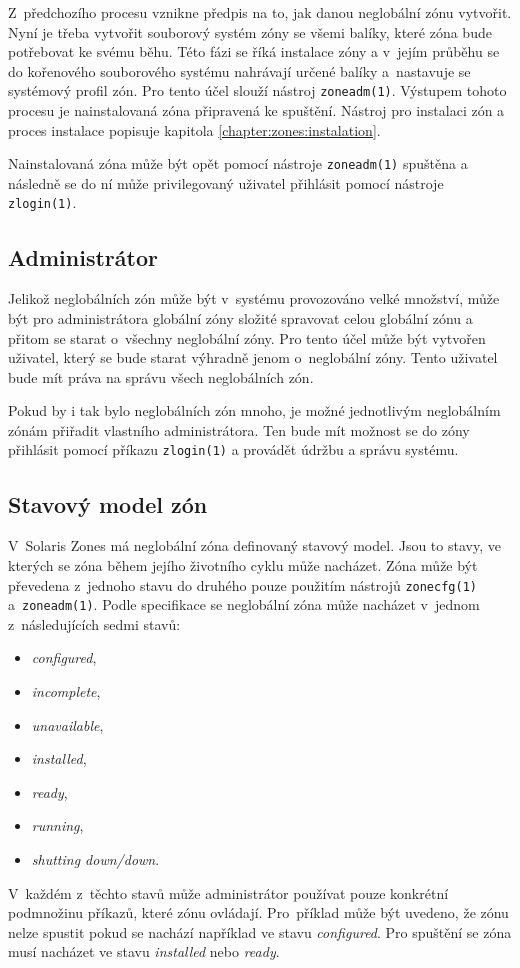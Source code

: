 Z~předchozího procesu vznikne předpis na to, jak danou neglobální zónu vytvořit. Nyní je třeba vytvořit souborový systém
zóny se všemi balíky, které zóna bude potřebovat ke svému běhu. Této fázi se říká instalace zóny a v~jejím průběhu se do
kořenového souborového systému nahrávají určené balíky a~nastavuje se systémový profil zón. Pro tento účel slouží nástroj
\verb|zoneadm(1)|. Výstupem tohoto procesu je nainstalovaná zóna připravená ke spuštění. Nástroj pro instalaci zón
a proces instalace popisuje kapitola \ref{chapter:zones:instalation}.

Nainstalovaná zóna může být opět pomocí nástroje \verb|zoneadm(1)| spuštěna a následně se do ní může privilegovaný 
uživatel přihlásit pomocí nástroje \verb|zlogin(1)|.
\subsection{Administrátor}
\label{chapter:zones:administration:administrator}
Jelikož neglobálních zón může být v~systému provozováno velké množství, může být pro administrátora globální zóny složité spravovat 
celou globální zónu a přitom se starat o~všechny neglobální zóny. Pro tento účel může být vytvořen uživatel, který se bude
starat výhradně jenom o~neglobální zóny. Tento uživatel bude mít práva na správu všech neglobálních zón.

Pokud by i tak bylo neglobálních zón mnoho, je možné jednotlivým neglobálním zónám přiřadit vlastního administrátora. Ten
bude mít možnost se do zóny přihlásit pomocí příkazu \verb|zlogin(1)| a provádět údržbu a správu systému.
\subsection{Stavový model zón}
\label{chapter:zones:administration:states}
V~Solaris Zones má neglobální zóna definovaný stavový model. Jsou to stavy, ve kterých se zóna během jejího životního cyklu
může nacházet. Zóna může být převedena z~jednoho stavu do druhého pouze použitím nástrojů \verb|zonecfg(1)| a~\verb|zoneadm(1)|.
Podle specifikace \cite{oracle:solaris:zones:states} se neglobální zóna může nacházet v~jednom
z~následujících sedmi stavů:
\begin{itemize}
 \item \textit{configured},
 \item \textit{incomplete},
 \item \textit{unavailable},
 \item \textit{installed},
 \item \textit{ready},
 \item \textit{running},
 \item \textit{shutting down/down}.
\end{itemize}
V~každém z~těchto stavů může administrátor používat pouze konkrétní podmnožinu příkazů, které zónu ovládají. Pro~příklad
může být uvedeno, že zónu nelze spustit pokud se nachází například ve stavu \textit{configured}. Pro spuštění se zóna musí
nacházet ve stavu \textit{installed} nebo \textit{ready}.

